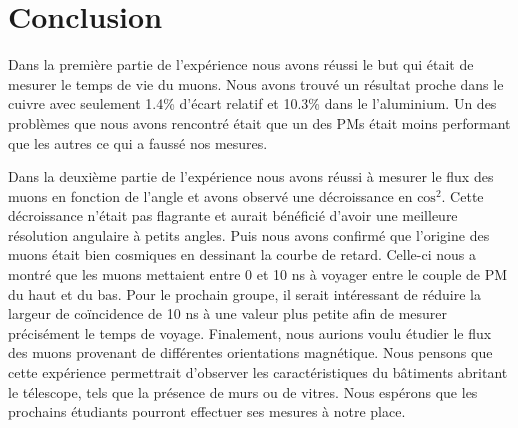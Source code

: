 \documentclass[12pt]{article}
\begin{document}
\section{Conclusion}

Dans la première partie de l'expérience nous avons réussi le but qui était de mesurer le temps de vie du muons. Nous avons trouvé un résultat proche dans le cuivre avec seulement 1.4\% d'écart relatif et 10.3\% dans le l'aluminium. Un des problèmes que nous avons rencontré était que un des PMs était moins performant que les autres ce qui a faussé nos mesures.

Dans la deuxième partie de l'expérience nous avons réussi à mesurer le flux des muons en fonction de l'angle et avons observé une décroissance en $\text{cos}^2$. Cette décroissance n'était pas flagrante et aurait bénéficié d'avoir une meilleure résolution angulaire à petits angles. Puis nous avons confirmé que l'origine des muons était bien cosmiques en dessinant la courbe de retard. Celle-ci nous a montré que les muons mettaient entre 0 et 10 ns à voyager entre le couple de PM du haut et du bas. Pour le prochain groupe, il serait intéressant de réduire la largeur de coïncidence de 10 ns à une valeur plus petite  afin de mesurer précisément le temps de voyage. Finalement, nous aurions voulu étudier le flux des muons provenant de différentes orientations magnétique. Nous pensons que cette expérience permettrait d'observer les caractéristiques du bâtiments abritant le télescope, tels que la présence de murs ou de vitres. Nous espérons que les prochains étudiants pourront effectuer ses mesures à notre place.




\newpage{}


\end{document}
